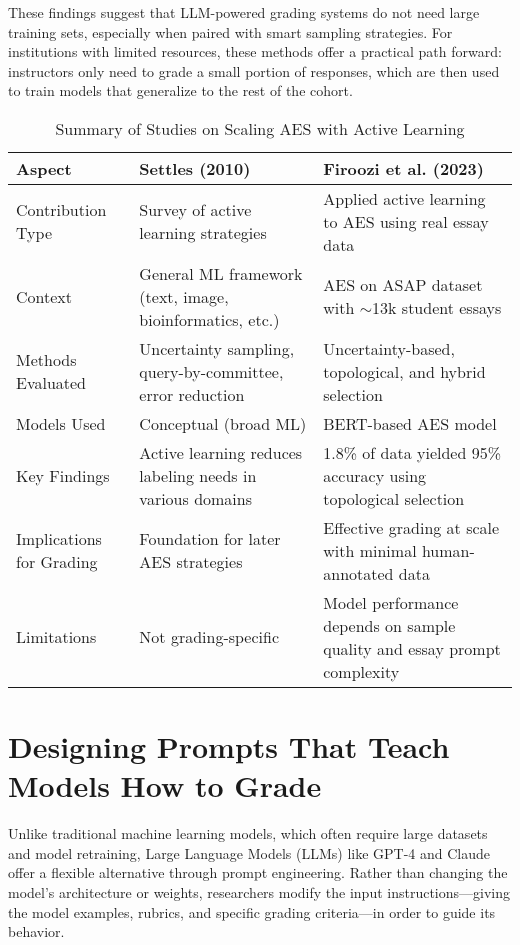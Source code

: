 These findings suggest that LLM-powered grading systems do not need large training sets, especially when paired with smart sampling strategies. For institutions with limited resources, these methods offer a practical path forward: instructors only need to grade a small portion of responses, which are then used to train models that generalize to the rest of the cohort.

\begin{table}[h]
  \centering
  \caption{Summary of Studies on Scaling AES with Active Learning}
  \label{tab:active_learning_aes}
  \begin{tabular}{@{}p{3.5cm}p{6.5cm}p{6.5cm}@{}}
  \toprule
  \textbf{Aspect} & \textbf{Settles (2010)} & \textbf{Firoozi et al. (2023)} \\
  \midrule
  Contribution Type & Survey of active learning strategies & Applied active learning to AES using real essay data \\
  \midrule
  Context & General ML framework (text, image, bioinformatics, etc.) & AES on ASAP dataset with $\sim$13k student essays \\
  \midrule
  Methods Evaluated & Uncertainty sampling, query-by-committee, error reduction & Uncertainty-based, topological, and hybrid selection \\
  \midrule
  Models Used & Conceptual (broad ML) & BERT-based AES model \\
  \midrule
  Key Findings & Active learning reduces labeling needs in various domains & 1.8\% of data yielded 95\% accuracy using topological selection \\
  \midrule
  Implications for Grading & Foundation for later AES strategies & Effective grading at scale with minimal human-annotated data \\
  \midrule
  Limitations & Not grading-specific & Model performance depends on sample quality and essay prompt complexity \\
  \bottomrule
  \end{tabular}
\end{table}
  
\section{Designing Prompts That Teach Models How to Grade}
Unlike traditional machine learning models, which often require large datasets and model retraining, Large Language Models (LLMs) like GPT-4 and Claude offer a flexible alternative through prompt engineering. Rather than changing the model's architecture or weights, researchers modify the input instructions—giving the model examples, rubrics, and specific grading criteria—in order to guide its behavior.

